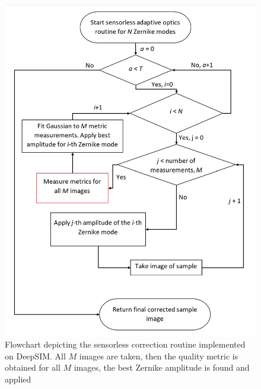 \begin{figure}[h]
	\centering
	\includegraphics[scale=0.65]{./images/sensorless_correction_workflow_DeepSIM.jpg}
	\caption{Flowchart depicting the sensorless correction routine implemented on DeepSIM. All $M$ images are taken, then the quality metric is obtained for all $M$ images, the best Zernike amplitude is found and applied }
	\label{fig:sensorless_correction_workflow_DeepSIM}
\end{figure}

